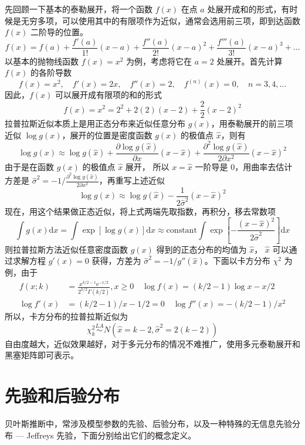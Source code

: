 \documentclass[12pt,a4paper,UTF8,twoside]{book}
\theoremstyle{definition}
\theoremstyle{definition}
\theoremstyle{definition}
\theoremstyle{remark}
\begin{document}
先回顾一下基本的泰勒展开，将一个函数 \(f(x)\) 在点 \(a\)
处展开成和的形式，有时候是无穷多项，可以使用其中的有限项作为近似，通常会选用前三项，即到达函数
\(f(x)\) 二阶导的位置。
\[ f(x) = f(a) + \frac{f'(a)}{1!}(x-a) + \frac{f''(a)}{2!}(x-a)^2 + \frac{f'''(a)}{3!}(x-a)^3 + \ldots \]
\noindent 以基本的抛物线函数 \(f(x) = x^2\) 为例，考虑将它在 \(a = 2\)
处展开。首先计算 \(f(x)\) 的各阶导数
\[ f(x) = x^2, \quad f'(x) = 2x, \quad f''(x) = 2, \quad f^{(n)}(x) = 0, \quad n = 3,4,\ldots \]
\noindent 因此，\(f(x)\) 可以展开成有限项的和的形式
\[ f(x) = x^2 = 2^2 + 2(2)(x-2) + \frac{2}{2}(x-2)^2 \]
拉普拉斯近似本质上是用正态分布来近似任意分布
\(g(x)\)，用泰勒展开的前三项近似 \(\log g(x)\)，展开的位置是密度函数
\(g(x)\) 的极值点 \(\hat{x}\)，则有
\[ \log g(x) \approx \log g(\hat{x}) + \frac{\partial \log g(\hat{x})}{\partial x} (x - \hat{x}) + \frac{\partial^2 \log g(\hat{x})}{2\partial x^2} (x - \hat{x})^2 \]
\noindent 由于是在函数 \(g(x)\) 的极值点 \(\hat{x}\) 展开， 所以
\(x = \hat{x}\) 一阶导是 0，用曲率去估计方差是
\(\hat{\sigma}^2 = -1/\frac{\partial^2 \log g(\hat{x})}{2\partial x^2}\)，再重写上述近似
\[ \log g(x) \approx \log g(\hat{x}) - \frac{1}{2\hat{\sigma}^2} (x - \hat{x})^2 \]
\noindent 现在，用这个结果做正态近似，将上式两端先取指数，再积分，移去常数项
\[ \int g(x) \mathrm{d}x = \int \exp[\log g(x)] \mathrm{d}x \approx \mathrm{constant} \int \exp[- \frac{(x - \hat{x})^2}{2\hat{\sigma}^2}] \mathrm{d}x \]
\noindent 则拉普拉斯方法近似任意密度函数 \(g(x)\) 得到的正态分布的均值为
\(\hat{x}\)， \(\hat{x}\) 可以通过求解方程 \(g'(x) = 0\) 获得，方差为
\(\hat{\sigma}^2 = -1/g''(\hat{x})\)。下面以卡方分布 \(\chi^2\)
为例，由于 \begin{align*}
    f(x; k) & = \frac{ x^{k/2-1} \mathrm{e}^{-x/2} }{ 2^{k/2}\Gamma(k/2) }, x \geq 0 \quad \log f(x) = (k/2 - 1) \log x - x/2 \\
 \log f'(x) & = (k/2-1)/x - 1/2 = 0 \quad \log f''(x)  = -(k/2-1)/x^2
\end{align*} \noindent 所以，卡方分布的拉普拉斯近似为
\[ \chi_{k}^2 \overset{LA}{\sim}  N(\hat{x} = k-2, \hat{\sigma}^2 = 2(k-2)) \]
\noindent 自由度越大，近似效果越好，对于多元分布的情况不难推广，使用多元泰勒展开和黑塞矩阵即可表示\citep{Tierney1986}。

\hypertarget{sec:bayes-prior}{%
\section{先验和后验分布}\label{sec:bayes-prior}}

贝叶斯推断中，常涉及模型参数的先验、后验分布，以及一种特殊的无信息先验分布
--- Jeffreys 先验，下面分别给出它们的概念定义\citep{mao2006}。
\end{document}
